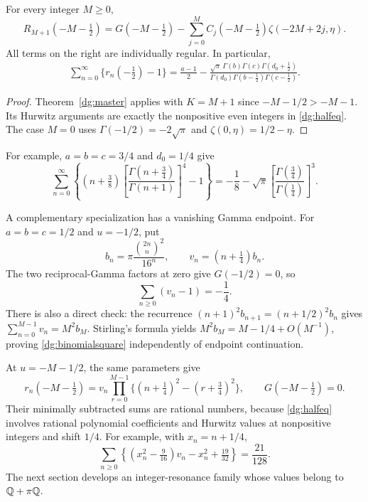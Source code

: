 \begin{corollary}\label{dg:half}
For every integer $M\ge0$,
\begin{equation}\label{dg:halfeq}
 R_{M+1}(-M-\tfrac12)
 =G(-M-\tfrac12)-\sum_{j=0}^{M}
       C_j(-M-\tfrac12)\zeta(-2M+2j,\eta).
\end{equation}
All terms on the right are individually regular. In particular,
\begin{align}
 \sum_{n=0}^{\infty}\{r_n(-\tfrac12)-1\}
 =\frac{a-1}{2}
 -\frac{\sqrt\pi\,\Gamma(b)\Gamma(c)\Gamma(d_0+\tfrac12)}
 {\Gamma(d_0)\Gamma(b-\tfrac12)\Gamma(c-\tfrac12)}.
 \label{dg:halfsimple}
\end{align}
\end{corollary}
\begin{proof}
Theorem~\ref{dg:master} applies with $K=M+1$ since
$-M-1/2>-M-1$. Its Hurwitz arguments are exactly the nonpositive
even integers in \eqref{dg:halfeq}. The case $M=0$ uses
$\Gamma(-1/2)=-2\sqrt\pi$ and $\zeta(0,\eta)=1/2-\eta$.
\end{proof}

For example, $a=b=c=3/4$ and $d_0=1/4$ give
\begin{equation}\label{dg:quarteridentity}
 \boxed{\sum_{n=0}^{\infty}\left\{
 (n+\tfrac38)\left[\frac{\Gamma(n+\tfrac34)}{\Gamma(n+1)}\right]^4-1
 \right\}=-\frac18-\sqrt\pi
     \left[\frac{\Gamma(\tfrac34)}{\Gamma(\tfrac14)}\right]^3.}
\end{equation}

A complementary specialization has a vanishing Gamma endpoint.
For $a=b=c=1/2$ and $u=-1/2$, put
\[
 b_n=\pi\frac{\binom{2n}{n}^2}{16^n},\qquad
 v_n=(n+\tfrac14)b_n.
\]
The two reciprocal-Gamma factors at zero give $G(-1/2)=0$, so
\begin{equation}\label{dg:binomialsquare}
 \sum_{n\ge0}(v_n-1)=-\frac14.
\end{equation}
There is also a direct check: the recurrence
$(n+1)^2b_{n+1}=(n+1/2)^2b_n$ gives
$\sum_{n=0}^{M-1}v_n=M^2b_M$. Stirling's formula yields
$M^2b_M=M-1/4+O(M^{-1})$, proving \eqref{dg:binomialsquare}
independently of endpoint continuation.

At $u=-M-1/2$, the same parameters give
\[
 r_n(-M-\tfrac12)=v_n\prod_{r=0}^{M-1}
           \{(n+\tfrac14)^2-(r+\tfrac34)^2\},\qquad
 G(-M-\tfrac12)=0.
\]
Their minimally subtracted sums are rational numbers, because
\eqref{dg:halfeq} involves rational polynomial coefficients and
Hurwitz values at nonpositive integers and shift $1/4$. For example,
with $x_n=n+1/4$,
\begin{equation}\label{dg:binomialsquareN1}
 \sum_{n\ge0}\left\{(x_n^2-\tfrac9{16})v_n-x_n^2+\tfrac{19}{32}\right\}
 =\frac{21}{128}.
\end{equation}
The next section develops an integer-resonance family whose values
belong to $\mathbb Q+\pi\mathbb Q$.

